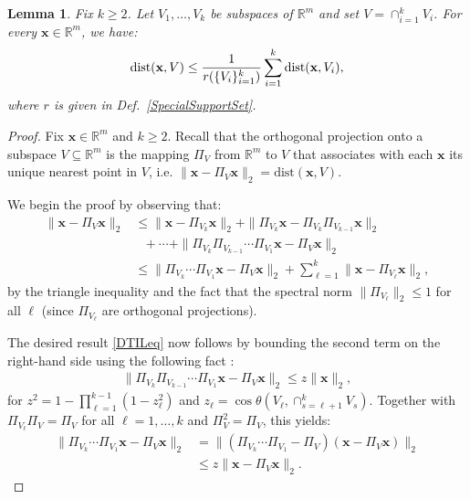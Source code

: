 \documentclass[9pt,twocolumn]{pnas-new}
\newtheorem{lemma}{Lemma}
\begin{document}
\begin{lemma}\label{DistanceToIntersectionLemma}
Fix $k \geq 2$. Let $V_1, \ldots, V_k$ be subspaces of $\mathbb{R}^m$ and set $V = \cap_{i = 1}^k V_i$. For every $\mathbf{x} \in \mathbb{R}^m$, we have:
\begin{align}\label{DTILeq}
\text{\rm dist}(\mathbf{x}, V) \leq \frac{1}{r(\{V_i\}_{i = 1}^k)} \sum_{i=1}^k \text{\rm dist}(\mathbf{x}, V_i),
\end{align}
where $r$ is given in Def.~\ref{SpecialSupportSet}.
\end{lemma}
\begin{proof} 
Fix $\mathbf{x} \in \mathbb{R}^m$ and $k \geq 2$. Recall that the orthogonal projection onto a subspace $V \subseteq \mathbb{R}^m$ is the mapping $\Pi_V$ from $\mathbb{R}^m$ to $V$ that associates with each $\mathbf{x}$ its unique nearest point in $V$, i.e. $\|\mathbf{x} - \Pi_V\mathbf{x}\|_2 = \text{dist}(\mathbf{x}, V)$.

We begin the proof by observing that:
\begin{align}\label{f}
\|\mathbf{x} - \Pi_V\mathbf{x}\|_2 &\leq \|\mathbf{x} - \Pi_{V_k} \mathbf{x}\|_2 + \|\Pi_{V_k}  \mathbf{x} - \Pi_{V_k}\Pi_{V_{k-1}}\mathbf{x}\|_2 \nonumber \\
&\ \ \ + \cdots + \|\Pi_{V_k} \Pi_{V_{k-1}}\cdots \Pi_{V_1} \mathbf{x} - \Pi_V \mathbf{x}\|_2 \nonumber \\
&\leq \|\Pi_{V_k}\cdots\Pi_{V_{1}} \mathbf{x} - \Pi_V \mathbf{x}\|_2 + \sum_{\ell=1}^k \|\mathbf{x} - \Pi_{V_{\ell}} \mathbf{x}\|_2,
\end{align}
%
by the triangle inequality and the fact that the spectral norm $\|\Pi_{V_{\ell}}\|_2 \leq 1$ for all $\ell$ (since $\Pi_{V_{\ell}}$ are orthogonal projections).

The desired result \eqref{DTILeq} now follows by bounding the second term on the right-hand side using the following fact \cite[Thm.~9.33]{Deutsch12}:
\begin{align}
\|\Pi_{V_k}\Pi_{V_{k-1}}\cdots\Pi_{V_1} \mathbf{x} - \Pi_V\mathbf{x}\|_2 \leq z \|\mathbf{x}\|_2, %
\end{align}
for \mbox{$z^2= 1 - \prod_{\ell =1}^{k-1}(1-z_{\ell}^2)$} and \mbox{$z_{\ell} = \cos\theta\left(V_{\ell}, \cap_{s=\ell+1}^k V_s\right)$}. Together with $\Pi_{V_\ell} \Pi_V = \Pi_V$ for all $\ell = 1, \ldots, k$ and $\Pi_V^2 = \Pi_V$, this yields:
\begin{align*}
\|\Pi_{V_k} \cdots \Pi_{V_1}\mathbf{x}  - \Pi_V \mathbf{x} \|_2 
&= \|\left( \Pi_{V_k} \cdots\Pi_{V_1} - \Pi_V \right) (\mathbf{x} - \Pi_V\mathbf{x})\|_2 \\
&\leq z\|\mathbf{x} - \Pi_V\mathbf{x}\|_2.
\end{align*}


\end{proof}
\end{document}
